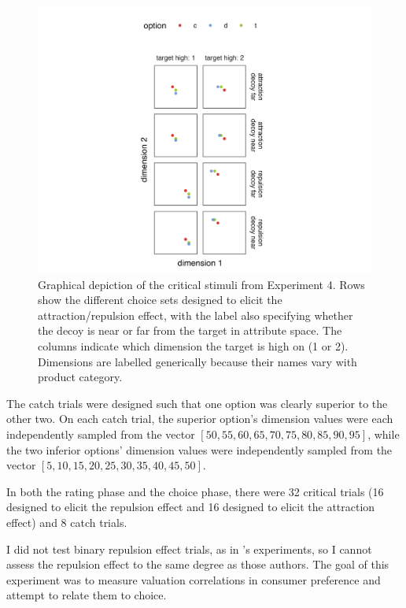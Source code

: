 \begin{figure}
    \includegraphics[width=150mm,scale=0.5]{figures/ce_rating_stim_for_paper.jpeg}
    \caption{Graphical depiction of the critical stimuli from Experiment 4. Rows show the different choice sets designed to elicit the attraction/repulsion effect, with the label also specifying whether the decoy is near or far from the target in attribute space. The columns indicate which dimension the target is high on (1 or 2). Dimensions are labelled generically because their names vary with product category.}
    \label{fig:ce_rating_stim}
\end{figure}

The catch trials were designed such that one option was clearly superior to the other two. On each catch trial, the superior option's dimension values were each independently sampled from the vector $[50,55,60,65,70,75,80,85,90,95]$, while the two inferior options' dimension values were independently sampled from the vector $[5,10,15,20,25,30,35,40,45,50]$. 

In both the rating phase and the choice phase, there were 32 critical trials (16 designed to elicit the repulsion effect and 16 designed to elicit the attraction effect) and 8 catch trials.

I did not test binary repulsion effect trials, as in \textcite{banerjeeFactorsThatPromote2024}'s experiments, so I cannot assess the repulsion effect to the same degree as those authors. The goal of this experiment was to measure valuation correlations in consumer preference and attempt to relate them to choice.

